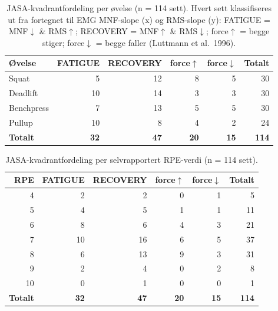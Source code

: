 
\begin{table}[ht]
  \centering
  \caption{JASA-kvadrantfordeling per øvelse (n = 114 sett).
    Hvert sett klassifiseres ut fra fortegnet til EMG MNF-slope (x) og RMS-slope (y):
    FATIGUE = MNF$\downarrow$ \& RMS$\uparrow$;
    RECOVERY = MNF$\uparrow$ \& RMS$\downarrow$;
    force$\uparrow$ = begge stiger;
    force$\downarrow$ = begge faller (Luttmann et al.\ 1996).}
  \label{tab:jasa_per_exercise}
  \begin{tabular}{lrrrrr}
    \toprule
    Øvelse      & FATIGUE & RECOVERY & force$\uparrow$ & force$\downarrow$ & Totalt \\
    \midrule
    Squat       &  5 & 12 & 8 & 5 & 30 \\
    Deadlift    & 10 & 14 & 3 & 3 & 30 \\
    Benchpress  &  7 & 13 & 5 & 5 & 30 \\
    Pullup      & 10 &  8 & 4 & 2 & 24 \\
    \midrule
    \textbf{Totalt} & \textbf{32} & \textbf{47} & \textbf{20} & \textbf{15} & \textbf{114} \\
    \bottomrule
  \end{tabular}
\end{table}

\begin{table}[ht]
  \centering
  \caption{JASA-kvadrantfordeling per selvrapportert RPE-verdi (n = 114 sett).}
  \label{tab:jasa_per_rpe}
  \begin{tabular}{rrrrrr}
    \toprule
    RPE & FATIGUE & RECOVERY & force$\uparrow$ & force$\downarrow$ & Totalt \\
    \midrule
     4 &  2 &  2 & 0 & 1 &  5 \\
     5 &  4 &  5 & 1 & 1 & 11 \\
     6 &  8 &  6 & 4 & 3 & 21 \\
     7 & 10 & 16 & 6 & 5 & 37 \\
     8 &  6 & 13 & 9 & 3 & 31 \\
     9 &  2 &  4 & 0 & 2 &  8 \\
    10 &  0 &  1 & 0 & 0 &  1 \\
    \midrule
    \textbf{Totalt} & \textbf{32} & \textbf{47} & \textbf{20} & \textbf{15} & \textbf{114} \\
    \bottomrule
  \end{tabular}
\end{table}

